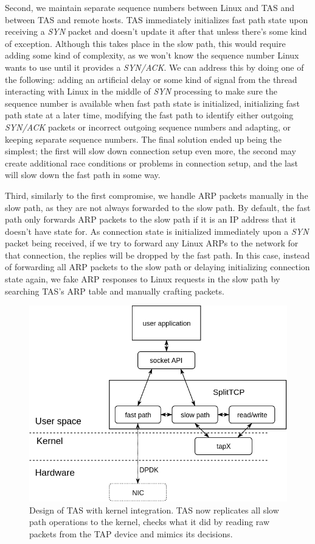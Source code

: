 Second, we maintain separate sequence numbers between Linux and TAS and 
between TAS and remote hosts. TAS immediately initializes fast path 
state upon receiving a \textit{SYN} packet and doesn't update it after that unless 
there's some kind of exception. Although this takes place in the slow path,
this would require adding some kind of complexity, as we won't know the sequence
number Linux wants to use until it provides a \textit{SYN/ACK}. We can address this by 
doing one of the following: adding an artificial delay or some kind of signal 
from the thread interacting with Linux in the middle of \textit{SYN} processing to make 
sure the sequence number is available when fast path state is initialized, 
initializing fast path state at a later time, modifying the fast path to 
identify either outgoing \textit{SYN/ACK} packets or incorrect outgoing sequence numbers
and adapting, or keeping separate sequence numbers. The final solution ended up 
being the simplest; the first will slow down connection setup even more, the 
second may create additional race conditions or problems in connection setup, 
and the last will slow down the fast path in some way.

Third, similarly to the first compromise, we handle ARP packets manually in 
the slow path, as they are not always forwarded to the slow path. By default,
the fast path only forwards ARP packets to the slow path if it is an IP address
that it doesn't have state for. As connection state is initialized immediately 
upon a \textit{SYN} packet being received, if we try to forward any Linux ARPs to the 
network for that connection, the replies will be dropped by the fast path. In
this case, instead of forwarding all ARP packets to the slow path or delaying
initializing connection state again, we fake ARP responses to Linux requests 
in the slow path by searching TAS's ARP table and manually crafting 
packets. 

\begin{figure}
\centering
\includegraphics[width=0.7\columnwidth]{figures/splittcp.png}
\caption{Design of TAS with kernel integration. TAS now replicates all slow path operations to the kernel, checks what
it did by reading raw packets from the TAP device and mimics its decisions.}
\label{fig:splittcp_tap}
\end{figure}
